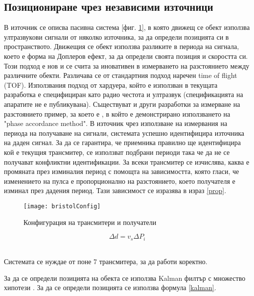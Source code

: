 \subsection{Позициониране чрез независими източници}

В източник \cite{bristolBeacons} се описва пасивна система [фиг. \ref{bristolVis}], в която движещ се обект използва ултразвукови сигнали от няколко източника, за да определи позицията си в пространството. Движещия се обект използва разликите в периода на сигнала, което е форма на Доплеров ефект, за да определи своята позиция и скоростта си. Този подход е нов и се счита за иновативен в измерването на разстоянието между различните обекти. Различава се от стандартния подход наречен time of flight (TOF). Използвания подход от хардуера, който е използван в текущата разработка е специфициран като радио честота и ултразвук \cite{hexamite} (спецификацията на апаратите не е публикувана). Съществуват и други разработки за измерване на разстоянието пример, за което е \cite{fastAndAccurate}, в който е демонстрирано използването на "phase accordance method". В източник \cite{bristolBeacons} чрез използване на измервания на периода на получаване на сигнали, системата успешно идентифицира източника на даден сигнал. За да се гарантира, че приемника правилно ще идентифицира кой е текущия трансмитер, се използват подбрани периоди така че да не се получават конфликтни идентификации. За всеки трансмитер се изчислява, каква е промяната през изминалия период с помощта на зависимостта, която гласи, че изменението на пулса е пропорционално на разстоянието, което получателя е изминал през дадения период. Тази зависимост се изразява в израз \ref{prop}.

\begin{figure}
    \centering
    \centerline{\texttt{[image: bristolConfig]}}
    \caption{Конфигурация на трансмитери и получатели}
    \label{bristolVis}
\end{figure}


\centerline{\begin{equation} \label{prop}
    \Delta d = v_s \Delta P_i
\end{equation}} \\

Системата се нуждае от поне 7 трансмитера, за да работи коректно.

За да се определи позицията на обекта се използва Kalman филтър с множество хипотези \cite{kalmanFilter}. За да се определи позицията се използва формула \ref{kalman}.

